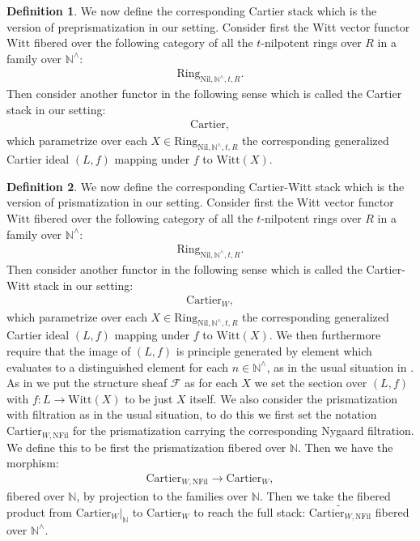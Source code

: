 \documentclass[12pt]{article}
\theoremstyle{definition}
\newtheorem{definition}{Definition}
\begin{document}
\begin{definition}
We now define the corresponding Cartier stack which is the version of preprismatization in our setting. Consider first the Witt vector functor $\mathrm{Witt}$ fibered over the following category of all the $t$-nilpotent rings over $R$ in a family over $\mathbb{N}^\wedge$:
\begin{align}
\mathrm{Ring}_{\mathrm{Nil},\mathbb{N}^\wedge,t,R}.
\end{align}
Then consider another functor in the following sense which is called the Cartier stack in our setting:
\begin{align}
\mathrm{Cartier},
\end{align}
which parametrize over each $X\in \mathrm{Ring}_{\mathrm{Nil},\mathbb{N}^\wedge,t,R}$ the corresponding generalized Cartier ideal $(L,f)$ mapping under $f$ to $\mathrm{Witt}(X)$.
\end{definition}


\begin{definition}
We now define the corresponding Cartier-Witt stack which is the version of prismatization in our setting. Consider first the Witt vector functor $\mathrm{Witt}$ fibered over the following category of all the $t$-nilpotent rings over $R$ in a family over $\mathbb{N}^\wedge$:
\begin{align}
\mathrm{Ring}_{\mathrm{Nil},\mathbb{N}^\wedge,t,R}.
\end{align}
Then consider another functor in the following sense which is called the Cartier-Witt stack in our setting:
\begin{align}
\mathrm{Cartier}_W,
\end{align}
which parametrize over each $X\in \mathrm{Ring}_{\mathrm{Nil},\mathbb{N}^\wedge,t,R}$ the corresponding generalized Cartier ideal $(L,f)$ mapping under $f$ to $\mathrm{Witt}(X)$. We then furthermore require that the image of $(L,f)$ is principle generated by element which evaluates to a distinguished element for each $n\in \mathbb{N}^\wedge$, as in the usual situation in \cite{2BL}. As in \cite{2BL} we put the structure sheaf $\mathcal{F}$ as for each $X$ we set the section over $(L,f)$ with $f:L\rightarrow \mathrm{Witt}(X)$ to be just $X$ itself. We also consider the prismatization with filtration as in the usual situation, to do this we first set the notation $\mathrm{Cartier}_{W,\mathrm{NFil}}$ for the prismatization carrying the corresponding Nygaard filtration. We define this to be first the prismatization fibered over $\mathbb{N}$. Then we have the morphism:
\begin{align}
\mathrm{Cartier}_{W,\mathrm{NFil}} \rightarrow \mathrm{Cartier}_{W},
\end{align}
fibered over $\mathbb{N}$, by projection to the families over $\mathbb{N}$. Then we take the fibered product from $\mathrm{Cartier}_W|_{\mathbb{N}}$ to $\mathrm{Cartier}_{W}$ to reach the full stack: $\widetilde{\mathrm{Cartier}_{W,\mathrm{NFil}}}$ fibered over $\mathbb{N}^\wedge$.
\end{definition}
\end{document}
